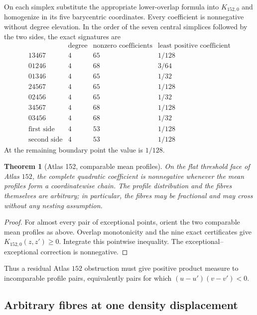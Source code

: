 \documentclass[11pt]{article}
\newtheorem{theorem}{Theorem}[section]
\begin{document}
On each simplex substitute the appropriate lower-overlap formula into
$K_{152,0}$ and homogenize in its five barycentric coordinates.  Every
coefficient is nonnegative without degree elevation.  In the order of the
seven central simplices followed by the two sides, the exact signatures are
\[
\begin{array}{c|ccc}
&\text{degree}&\text{nonzero coefficients}&\text{least positive coefficient}\\ \hline
13467&4&65&1/128\\
01246&4&68&3/64\\
01346&4&65&1/32\\
24567&4&65&1/128\\
02456&4&65&1/32\\
34567&4&68&1/128\\
03456&4&68&1/32\\
\text{first side}&4&53&1/128\\
\text{second side}&4&53&1/128
\end{array}
\]
At the remaining boundary point the value is $1/128$.

\begin{theorem}[Atlas 152, comparable mean profiles]
\label{thm:atlas152-comparable-means}
On the flat threshold face of Atlas $152$, the complete quadratic
coefficient is nonnegative whenever the mean profiles form a coordinatewise
chain.  The profile distribution and the fibres themselves are arbitrary;
in particular, the fibres may be fractional and may cross without any
nesting assumption.
\end{theorem}

\begin{proof}
For almost every pair of exceptional points, orient the two comparable mean
profiles as above.  Overlap monotonicity and the nine exact certificates give
$K_{152,0}(z,z')\geq0$.  Integrate this pointwise inequality.  The
exceptional--exceptional correction is nonnegative.
\end{proof}

Thus a residual Atlas $152$ obstruction must give positive product measure
to incomparable profile pairs, equivalently pairs for which
$(u-u')(v-v')<0$.

\subsection{Arbitrary fibres at one density displacement}
\end{document}
